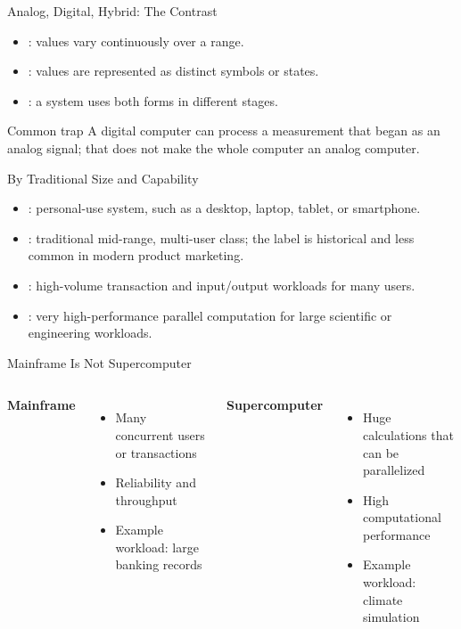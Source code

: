\documentclass[aspectratio=169]{beamer}
\begin{document}
\begin{frame}{Analog, Digital, Hybrid: The Contrast}
  \begin{itemize}
    \item {}: values vary continuously over a range.
    \item {}: values are represented as distinct symbols or states.
    \item {}: a system uses both forms in different stages.
  \end{itemize}
  \begin{alertblock}{Common trap}
    A digital computer can process a measurement that began as an analog
    signal; that does not make the whole computer an analog computer.
  \end{alertblock}
\end{frame}

\begin{frame}{By Traditional Size and Capability}
  \begin{itemize}
    \item {}: personal-use system, such as a desktop, laptop,
      tablet, or smartphone.
    \item {}: traditional mid-range, multi-user class; the
      label is historical and less common in modern product marketing.
    \item {}: high-volume transaction and input/output workloads
      for many users.
    \item {}: very high-performance parallel computation for
      large scientific or engineering workloads.
  \end{itemize}
\end{frame}

\begin{frame}{Mainframe Is Not Supercomputer}
  \begin{columns}[T]
      \textbf{Mainframe}
      \begin{itemize}
        \item Many concurrent users or transactions
        \item Reliability and throughput
        \item Example workload: large banking records
      \end{itemize}
      \textbf{Supercomputer}
      \begin{itemize}
        \item Huge calculations that can be parallelized
        \item High computational performance
        \item Example workload: climate simulation
      \end{itemize}
  \end{columns}
  \vspace{0.3cm}
\end{frame}
\end{document}
